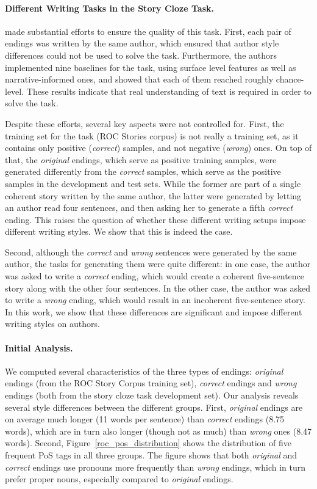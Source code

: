 \documentclass[11pt,a4paper]{article}
\newcommand{\figref}[1]{Figure~\ref{#1}}
\begin{document}
\paragraph{Different Writing Tasks in the Story Cloze Task.}
\citet{Mostafazadeh:2016} made substantial efforts to ensure the quality of this task. 
First, each pair of endings was written by the same author, which ensured that author style differences could not be used to solve the task. 
Furthermore, the authors implemented nine baselines for the task, using surface level features as well as narrative-informed ones, and showed that each of them reached roughly chance-level.
These results indicate that real understanding of text is required in order to solve the task.

Despite these efforts, several key aspects were not controlled for. 
First, the training set for the task (ROC Stories corpus) is not really a training set, as it contains only positive ({\it correct}) samples, and not negative ({\it wrong}) ones. 
On top of that, the {\it original} endings, which serve as positive training samples, were generated differently from the {\it correct} samples, which serve as the positive samples in the development and test sets. 
While the former are part of a single coherent story written by the same author, the latter were generated by letting an author read four sentences, 
and then asking her to generate a fifth {\it correct} ending. 
This raises the question of whether these different writing setups impose different writing styles. 
We show that this is indeed the case. 

Second, although the {\it correct} and {\it wrong} sentences were generated by the same author, 
the tasks for generating them were quite different: in one case, the author was asked to write a {\it correct} ending, which would create a coherent five-sentence story along with the other four sentences. In the other case, the author was asked to write a {\it wrong} ending, which would result in an incoherent five-sentence story. 
In this work, we show that these differences are significant and impose different writing styles on authors.

\paragraph{Initial Analysis.}
We computed several characteristics of the three types of endings: {\it original} endings (from the ROC Story Corpus training set), {\it correct} endings and {\it wrong} endings (both from the story cloze task development set).
Our analysis  reveals several style differences between the different groups. 
First, {\it original} endings are on average much longer (11 words per sentence) than {\it correct} endings (8.75 words), which are in turn also longer (though not as much)  than {\it wrong} ones (8.47 words).
Second, \figref{roc_pos_distribution} shows the distribution of five frequent PoS tags in all three groups. 
The figure shows that both {\it original} and {\it correct} endings use pronouns more frequently than {\it wrong} endings,
which in turn prefer proper nouns, especially compared to {\it original} endings.
\end{document}
